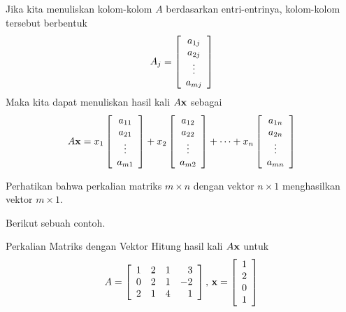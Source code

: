 Jika kita menuliskan kolom-kolom $A$ berdasarkan entri-entrinya, kolom-kolom tersebut berbentuk
\begin{equation*}
A_{j}  =
\left[
\begin{array}{c}
a_{1j} \\
a_{2j} \\
\vdots \\
a_{mj}
\end{array}
\right] 
\end{equation*}
Maka kita dapat menuliskan hasil kali $A\mathbf{x}$ sebagai
\begin{equation*}
A\mathbf{x} = 
x_{1}\left[
\begin{array}{c}
a_{11} \\
a_{21} \\
\vdots \\
a_{m1}
\end{array}
\right] + x_{2}\left[
\begin{array}{c}
a_{12} \\
a_{22} \\
\vdots \\
a_{m2}
\end{array}
\right] +\cdots + x_{n}\left[
\begin{array}{c}
a_{1n} \\
a_{2n} \\
\vdots \\
a_{mn}
\end{array}
\right] 
\end{equation*}

Perhatikan bahwa perkalian matriks $m \times n$ dengan vektor $n \times 1$ menghasilkan vektor $m \times 1$.

Berikut sebuah contoh.

\begin{example}{Perkalian Matriks dengan Vektor}\label{exa:vectormultbymatrix}
Hitung hasil kali $A\mathbf{x}$ untuk
\begin{equation*}
A = \left[
\begin{array}{rrrr}
1 & 2 & 1 & 3 \\
0 & 2 & 1 & -2 \\
2 & 1 & 4 & 1
\end{array}
\right],\,  \mathbf{x} =  \left[
\begin{array}{r}
1 \\
2 \\
0 \\
1
\end{array}
\right] 
\end{equation*}
\end{example}

